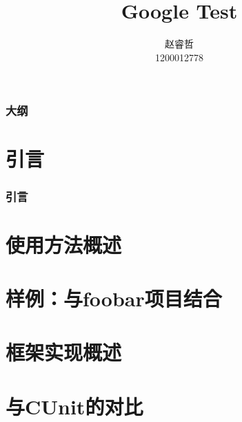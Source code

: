 \documentclass[xelatex]{beamer}
\begin{document}
\title{Google Test}
\author{赵睿哲\\1200012778}
\frame{\titlepage}


\begin{frame}
	\frametitle{大纲}
	\tableofcontents
\end{frame}	

\section{引言}
\begin{frame}
	\frametitle{引言}
\end{frame}

\section{使用方法概述}

\section{样例：与foobar项目结合}

\section{框架实现概述}

\section{与CUnit的对比}
\end{document}

